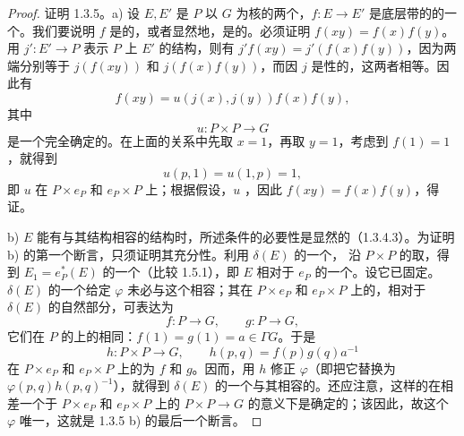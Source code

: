 \begin{proof}
证明 1.3.5。a) 设 $E,E'$ 是 $P$ 以 $G$ 为核的两个，$f:E\to E'$ 是底层带的的一个。我们要说明 $f$ 是的，或者显然地，是的。必须证明 $f(xy)=f(x)f(y)$。用 $j':E'\to P$ 表示 $P$ 上 $E'$ 的结构，则有 $j'f(xy)=j'(f(x)f(y))$，因为两端分别等于 $j(f(xy))$ 和 $j(f(x)f(y))$，而因 $j$ 是性的，这两者相等。因此有
\[
f(xy)=u(j(x),j(y))f(x)f(y),
\]
其中
\[
u:P\times P\longrightarrow G
\]
是一个完全确定的。在上面的关系中先取 $x=1$，再取 $y=1$，考虑到 $f(1)=1$，就得到
\[
u(p,1)=u(1,p)=1,
\]
即 $u$ 在 $P\times e_P$ 和 $e_P\times P$ 上；根据假设，$u$ ，因此 $f(xy)=f(x)f(y)$，得证。

b) $E$ 能有与其结构相容的结构时，所述条件的必要性是显然的（1.3.4.3）。为证明 b) 的第一个断言，只须证明其充分性。利用 $\delta(E)$ 的一个，
沿 $P\times P$ 的取，得到 $E_1=e_P^*(E)$ 的一个（比较 1.5.1），即 $E$ 相对于 $e_P$ 的一个。设它已固定。$\delta(E)$ 的一个给定 $\varphi$ 未必与这个相容；其在 $P\times e_P$ 和 $e_P\times P$ 上的，相对于 $\delta(E)$ 的自然部分，可表达为
\[
f:P\longrightarrow G,\qquad g:P\longrightarrow G,
\]
它们在 $P$ 的上的相同：$f(1)=g(1)=a\in\Gamma G$。于是
\[
h:P\times P\longrightarrow G,\qquad h(p,q)=f(p)g(q)a^{-1}
\]
在 $P\times e_P$ 和 $e_P\times P$ 上的为 $f$ 和 $g$。因而，用 $h$ 修正 $\varphi$（即把它替换为 $\varphi(p,q)h(p,q)^{-1}$），就得到 $\delta(E)$ 的一个与其相容的。还应注意，这样的在相差一个于 $P\times e_P$ 和 $e_P\times P$ 上的 $P\times P\to G$ 的意义下是确定的；该因此，故这个 $\varphi$ 唯一，这就是 1.3.5 b) 的最后一个断言。


\end{proof}
